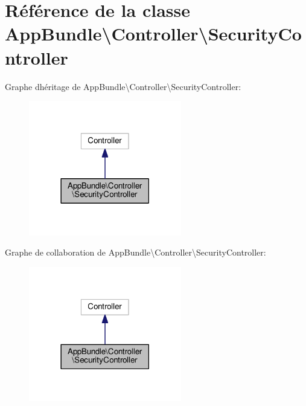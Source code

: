 \hypertarget{classAppBundle_1_1Controller_1_1SecurityController}{}\section{Référence de la classe App\+Bundle\textbackslash{}Controller\textbackslash{}Security\+Controller}
\label{classAppBundle_1_1Controller_1_1SecurityController}


Graphe d\textquotesingle{}héritage de App\+Bundle\textbackslash{}Controller\textbackslash{}Security\+Controller\+:\nopagebreak
\begin{figure}[H]
\begin{center}
\leavevmode
\includegraphics[width=189pt]{classAppBundle_1_1Controller_1_1SecurityController__inherit__graph}
\end{center}
\end{figure}


Graphe de collaboration de App\+Bundle\textbackslash{}Controller\textbackslash{}Security\+Controller\+:\nopagebreak
\begin{figure}[H]
\begin{center}
\leavevmode
\includegraphics[width=189pt]{classAppBundle_1_1Controller_1_1SecurityController__coll__graph}
\end{center}
\end{figure}
